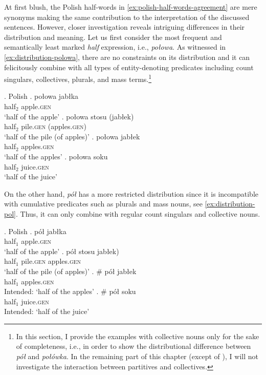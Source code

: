 At first blush, the Polish half-words in \ref{ex:polish-half-words-agreement} are mere synonyms making the same contribution to the interpretation of the discussed sentences. However, closer investigation reveals intriguing differences in their distribution and meaning. Let us first consider the most frequent and semantically least marked \textit{half} expression, i.e., \textit{połowa}. As witnessed in \ref{ex:distribution-polowa}, there are no constraints on its distribution and it can felicitously combine with all types of entity-denoting predicates including count singulars, collectives, plurals, and mass terms.\footnote{In this section, I provide the examples with collective nouns only for the sake of completeness, i.e., in order to show the distributional difference between \textit{pół} and \textit{połówka}. In the remaining part of this chapter (except of ), I will not investigate the interaction between partitives and collectives.}
		
		\ex. Polish\label{ex:distribution-polowa}
        \ag. połowa jabłka\\
		half$_2$ apple\textsc{.gen}\\
		`half of the apple'\label{ex:distribution-polowa-sg}
		\bg. połowa  stosu (jabłek)\\
		half$_2$ pile\textsc{.gen} (apples\textsc{.gen})\\
		`half of the pile (of apples)'\label{ex:distribution-polowa-group}
		\bg. połowa jabłek\\
		half$_2$ apples\textsc{.gen}\\
		`half of the apples'\label{ex:distribution-polowa-pl}
		\bg. połowa soku\\
		half$_2$ juice\textsc{.gen}\\
		`half of the juice'\label{ex:distribution-polowa-mass}

On the other hand, \textit{pół} has a more restricted distribution since it is incompatible with cumulative predicates such as plurals and mass nouns, see \ref{ex:distribution-pol}. Thus, it can only combine with regular count singulars and collective nouns.\largerpage
		
		\ex. Polish\label{ex:distribution-pol}
        \ag. pół jabłka\\
		half$_1$ apple\textsc{.gen}\\
		`half of the apple'\label{ex:distribution-pol-sg}
		\bg. pół stosu \minsp{(} jabłek)\\
		half$_1$ pile\textsc{.gen} {} apples\textsc{.gen}\\
		`half of the pile (of apples)'\label{ex:distribution-pol-group}
		\bg. \# pół jabłek\\
		half$_1$ apples\textsc{.gen}\label{ex:distribution-pol-pl}\\
		Intended: `half of the apples'
		\bg. \# pół soku\\
		half$_1$ juice\textsc{.gen}\label{ex:distribution-pol-mass}\\
		Intended: `half of the juice'

